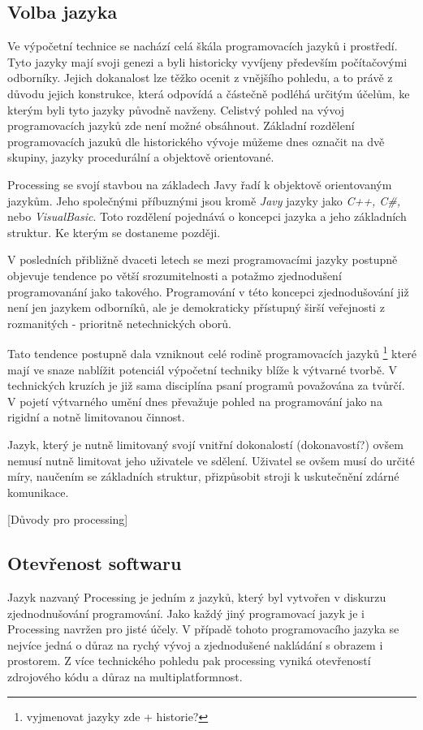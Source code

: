 \documentclass[11pt]{article}
\begin{document}
\subsection{Volba jazyka}


Ve výpočetní technice se nachází celá škála programovacích jazyků i prostředí. Tyto jazyky mají svoji genezi a byli historicky vyvíjeny především počítačovými odborníky. Jejich dokanalost lze těžko ocenit z vnějšího pohledu, a to právě z důvodu jejich konstrukce, která odpovídá a částečně podléhá určitým účelům, ke kterým byli tyto jazyky původně navženy. Celistvý pohled na vývoj programovacích jazyků zde není možné obsáhnout. Základní rozdělení programovacích jazuků dle historického vývoje můžeme dnes označit na dvě skupiny, jazyky procedurální a objektově orientované.

Processing se svojí stavbou na základech Javy řadí k objektově orientovaným jazykům. Jeho společnými příbuznými jsou kromě {\em Javy} jazyky jako {\em C++, C\#,} nebo {\em VisualBasic}. Toto rozdělení pojednává o koncepci jazyka a jeho základních struktur. Ke kterým se dostaneme později. 

V posledních přibližně dvaceti letech se mezi programovacími jazyky postupně objevuje tendence po větší srozumitelnosti a potažmo zjednodušení programovanání jako takového. Programování v této koncepci zjednodušování již není jen jazykem odborníků, ale je demokraticky přístupný širší veřejnosti z rozmanitých - prioritně netechnických oborů.

Tato tendence postupně dala vzniknout celé rodině programovacích jazyků
\footnote{vyjmenovat jazyky zde + historie?}
které mají ve snaze nablížit potenciál výpočetní techniky blíže k výtvarné tvorbě. V technických kruzích je již sama disciplína psaní programů považována za tvůrčí. V pojetí výtvarného umění dnes převažuje pohled na programování jako na rigidní a notně limitovanou činnost.

Jazyk, který je nutně limitovaný svojí vnitřní dokonalostí (dokonavostí?) ovšem nemusí nutně limitovat jeho uživatele ve sdělení. Uživatel se ovšem musí do určité míry, naučením se základních struktur, přizpůsobit stroji k uskutečnění zdárné komunikace.

[Důvody pro processing]

\subsection{Otevřenost softwaru}

Jazyk nazvaný Processing je jedním z jazyků, který byl vytvořen v diskurzu zjednodnušování programování. Jako každý jiný programovací jazyk je i Processing navržen pro jisté účely. V případě tohoto programovacího jazyka se nejvíce jedná o důraz na rychý vývoj a zjednodušené nakládání s obrazem i prostorem. Z více technického pohledu pak processing vyniká otevřeností zdrojového kódu a důraz na multiplatformnost.
\end{document}
